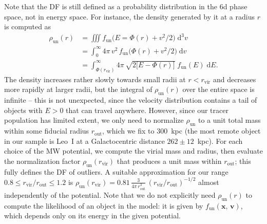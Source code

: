 \documentclass[usenatbib,fleqn]{mnras}
\begin{document}
Note that the DF is still defined as a probability distribution in the 6d phase space, not in energy space. For instance, the density generated by it at a radius $r$ is computed as
\begin{equation}
\begin{aligned}  \label{eq:density_unmixed}
\rho_\text{un}(r) &= \iiint f_\text{un} \big(E=\Phi(r)+v^2/2\big)\;\text{d}^3v \\
&= \int_0^\infty 4\pi\, v^2\,f_\text{un}\big(\Phi(r)+v^2/2\big)\;\text{d}v \\
&= \int_{\Phi(r_\text{vir})}^\infty 4\pi\,\sqrt{2\big[E-\Phi(r)\big]}\; f_\text{un}(E)\;\text{d}E .
\end{aligned}
\end{equation}
The density increases rather slowly towards small radii at $r<r_\text{vir}$ and decreases more rapidly at larger radii, but the integral of $\rho_\text{un}(r)$ over the entire space is infinite -- this is not unexpected, since the velocity distribution contains a tail of objects with $E>0$ that can travel anywhere. However, since our tracer population has limited extent, we only need to normalize $\rho_\text{un}$ to a unit total mass within some fiducial radius $r_\text{out}$, which we fix to 300~kpc (the most remote object in our sample is Leo~I at a Galactocentric distance $262\pm12$~kpc). For each choice of the MW potential, we compute the virial mass and radius, then evaluate the normalization factor $\rho_\text{un}(r_\text{vir})$ that produces a unit mass within $r_\text{out}$; this fully defines the DF of outliers. A suitable approximation for our range $0.8\le r_\text{vir}/r_\text{out}\le 1.2$ is $\rho_\text{un}(r_\text{vir}) = 0.81\,\frac{3}{4\pi\,r_\text{out}^3}\,(r_\text{vir}/r_\text{out})^{-1/2}$ almost independently of the potential. Note that we do not explicitly need $\rho_\text{un}(r)$ to compute the likelihood of an object in the model: it is given by $f_\text{un}(\boldsymbol x,\, \boldsymbol{v})$, which depends only on its energy in the given potential.
\end{document}
